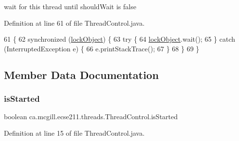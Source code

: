 wait for this thread until should\+Wait is false 

Definition at line 61 of file Thread\+Control.\+java.


\begin{DoxyCode}
61                                   \{
62     \textcolor{keyword}{synchronized} (\hyperlink{classca_1_1mcgill_1_1ecse211_1_1threads_1_1_thread_control_ab20c44ff2dafab8981c42fa8bf634dfc}{lockObject}) \{
63       \textcolor{keywordflow}{try} \{
64         \hyperlink{classca_1_1mcgill_1_1ecse211_1_1threads_1_1_thread_control_ab20c44ff2dafab8981c42fa8bf634dfc}{lockObject}.wait();
65       \} \textcolor{keywordflow}{catch} (InterruptedException e) \{
66         e.printStackTrace();
67       \}
68     \}
69   \}
\end{DoxyCode}


\subsection{Member Data Documentation}
\mbox{\label{classca_1_1mcgill_1_1ecse211_1_1threads_1_1_thread_control_abb0ba2385c212f3d0d8435267d882536}} 
\subsubsection{\texorpdfstring{is\+Started}{isStarted}}
{\footnotesize\ttfamily boolean ca.\+mcgill.\+ecse211.\+threads.\+Thread\+Control.\+is\+Started\hspace{0.3cm}{\ttfamily [protected]}}



Definition at line 15 of file Thread\+Control.\+java.

\mbox{\label{classca_1_1mcgill_1_1ecse211_1_1threads_1_1_thread_control_ab20c44ff2dafab8981c42fa8bf634dfc}} 

